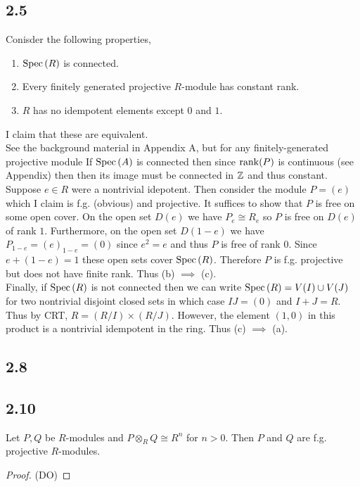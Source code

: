 \documentclass[12pt]{article}
\begin{document}
\subsection{2.5}

Conisder the following properties,
\begin{enumerate}
\item $\mathrm{Spec}\left( R \right)$ is connected.
\item Every finitely generated projective $R$-module has constant rank.
\item $R$ has no idempotent elements except $0$ and $1$.
\end{enumerate}
I claim that these are equivalent. 
\bigskip\\
See the background material in Appendix A, but for any finitely-generated projective module
If $\mathrm{Spec}\left( A \right)$ is connected then since $\mathrm{rank}(P)$ is continuous (see Appendix) then then its image must be connected in $\mathbb{Z}$ and thus constant.
\bigskip\\
Suppose $e \in R$ were a nontrivial idepotent. Then consider the module $P = (e)$ which I claim is f.g. (obvious) and projective. It suffices to show that $P$ is free on some open cover. On the open set $D(e)$ we have $P_e \cong R_e$ so $P$ is free on $D(e)$ of rank $1$. Furthermore, on the open set $D(1 - e)$ we have $P_{1 - e} = (e)_{1 - e} = (0)$ since $e^2 = e$ and thus $P$ is free of rank $0$. Since $e + (1 - e) = 1$ these open sets cover $\mathrm{Spec}\left( R \right)$. Therefore $P$ is f.g. projective but does not have finite rank. Thus (b) $\implies$ (c).
\bigskip\\
Finally, if $\mathrm{Spec}\left( R \right)$ is not connected then we can write $\mathrm{Spec}\left( R \right) = V(I) \cup V(J)$ for two nontrivial disjoint closed sets in which case $IJ = (0)$ and $I + J = R$. Thus by CRT, $R = (R / I) \times (R / J)$. However, the element $(1, 0)$ in this product is a nontrivial idempotent in the ring. Thus (c) $\implies$ (a). 

\subsection{2.8}

\subsection{2.10}

Let $P, Q$ be $R$-modules and $P \otimes_R Q \cong R^n$ for $n > 0$. Then $P$ and $Q$ are f.g. projective $R$-modules. 

\begin{proof}
(DO)
\end{proof}
\end{document}

